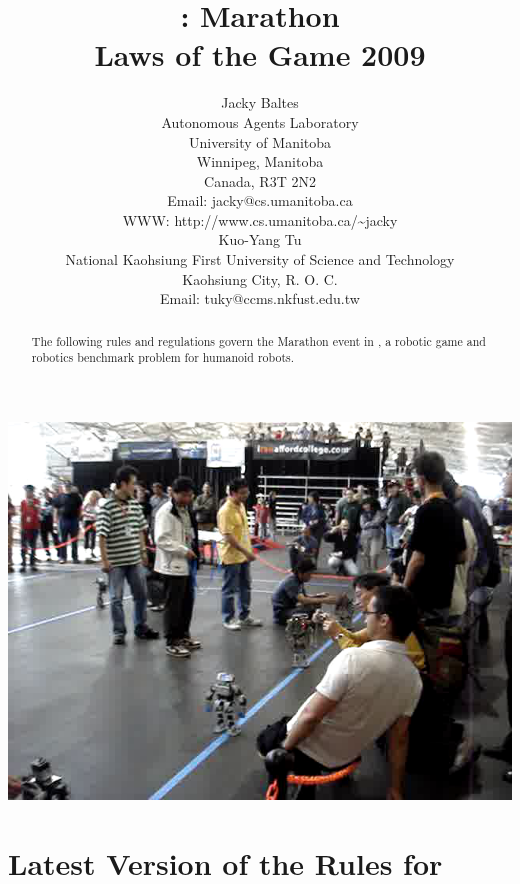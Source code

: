 \documentclass[12pt]{hurocup}
\begin{document}
\title{\HuroCup: Marathon\\
  Laws of the Game 2009}


\author{Jacky Baltes\\
Autonomous Agents Laboratory\\
University of Manitoba\\
Winnipeg, Manitoba\\
Canada, R3T 2N2\\
Email: jacky@cs.umanitoba.ca\\
WWW: http://www.cs.umanitoba.ca/\~{ }jacky\\[5mm]
Kuo-Yang Tu\\
National Kaohsiung First University of Science and Technology\\
Kaohsiung City, R. O. C.\\
Email: tuky@ccms.nkfust.edu.tw\\
}

\maketitle

\begin{center}
 \includegraphics[width=0.7\linewidth]{Figures/marathon-life}
\end{center}

\begin{abstract}
The following rules and regulations govern the Marathon event in
\HuroCup, a robotic game and robotics benchmark problem for humanoid
robots.
%
\end{abstract}

\section*{Latest Version of the Rules for \HuroCup}
\label{sec:updates}
\end{document}
